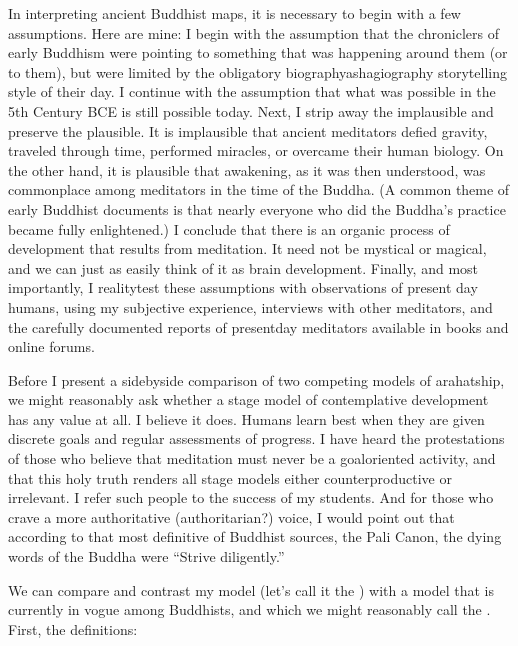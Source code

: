 \documentclass[a5paper,10pt,english]{book}
\begin{document}
\sphinxAtStartPar
In interpreting ancient Buddhist maps, it is necessary to begin with a
few assumptions. Here are mine: I begin with the assumption that the
chroniclers of early Buddhism were pointing to something that was
happening around them (or to them), but were limited by the obligatory
biography\sphinxhyphen{}as\sphinxhyphen{}hagiography storytelling style of their day. I continue
with the assumption that what was possible in the 5th Century BCE is
still possible today. Next, I strip away the implausible and preserve
the plausible. It is implausible that ancient meditators defied gravity,
traveled through time, performed miracles, or overcame their human
biology. On the other hand, it is plausible that awakening, as it was
then understood, was commonplace among meditators in the time of the
Buddha. (A common theme of early Buddhist documents is that nearly
everyone who did the Buddha’s practice became fully enlightened.) I
conclude that there is an organic process of development that results
from meditation. It need not be mystical or magical, and we can just as
easily think of it as brain development. Finally, and most importantly,
I reality\sphinxhyphen{}test these assumptions with observations of present day
humans, using my subjective experience, interviews with other
meditators, and the carefully documented reports of present\sphinxhyphen{}day
meditators available in books and online forums.

\sphinxAtStartPar
Before I present a side\sphinxhyphen{}by\sphinxhyphen{}side comparison of two competing models of
arahatship, we might reasonably ask whether a stage model of
contemplative development has any value at all. I believe it does.
Humans learn best when they are given discrete goals and regular
assessments of progress. I have heard the protestations of those who
believe that meditation must never be a goal\sphinxhyphen{}oriented activity, and that
this holy truth renders all stage models either counterproductive or
irrelevant. I refer such people to the success of my students. And for
those who crave a more authoritative (authoritarian?) voice, I would
point out that according to that most definitive of Buddhist sources,
the Pali Canon, the dying words of the Buddha were “Strive diligently.”

\sphinxAtStartPar
We can compare and contrast my model (let’s call it the ) with a model that is currently in vogue among Buddhists, and
which we might reasonably call the . First, the
definitions:
\end{document}
